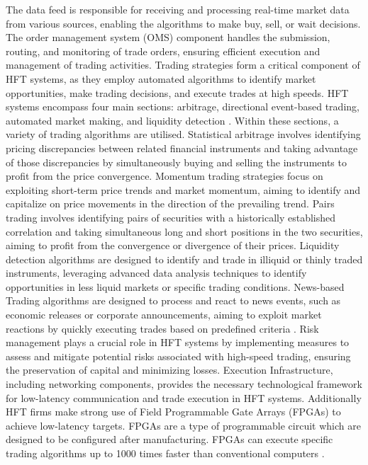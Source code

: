\documentclass{article}
\theoremstyle{break}
\begin{document}
The data feed is responsible for receiving and processing real-time market data from various sources, enabling the algorithms to make buy, sell, or  wait decisions. The order management system (OMS) component handles the submission, routing, and monitoring of trade orders, ensuring efficient execution and management of trading activities. Trading strategies form a critical component of HFT systems, as they employ automated algorithms to identify market opportunities, make trading decisions, and execute trades at high speeds. HFT systems encompass four main sections: arbitrage, directional event-based trading, automated market making, and liquidity detection \cite{2}. Within these sections, a variety of trading algorithms are utilised. Statistical arbitrage involves identifying pricing discrepancies between related financial instruments and taking advantage of those discrepancies by simultaneously buying and selling the instruments to profit from the price convergence. Momentum trading strategies focus on exploiting short-term price trends and market momentum, aiming to identify and capitalize on price movements in the direction of the prevailing trend. Pairs trading involves identifying pairs of securities with a historically established correlation and taking simultaneous long and short positions in the two securities, aiming to profit from the convergence or divergence of their prices. Liquidity detection algorithms are designed to identify and trade in illiquid or thinly traded instruments, leveraging advanced data analysis techniques to identify opportunities in less liquid markets or specific trading conditions. News-based Trading algorithms are designed to process and react to news events, such as economic releases or corporate announcements, aiming to exploit market reactions by quickly executing trades based on predefined criteria \cite{3}. Risk management plays a crucial role in HFT systems by implementing measures to assess and mitigate potential risks associated with high-speed trading, ensuring the preservation of capital and minimizing losses. Execution Infrastructure, including networking components, provides the necessary technological framework for low-latency communication and trade execution in HFT systems. Additionally HFT firms make strong use of Field Programmable Gate Arrays (FPGAs) to achieve low-latency targets. FPGAs are a type of programmable circuit which are designed to be configured after manufacturing. FPGAs can execute specific trading algorithms up to 1000 times faster than conventional computers \cite{4}. 
\end{document}
